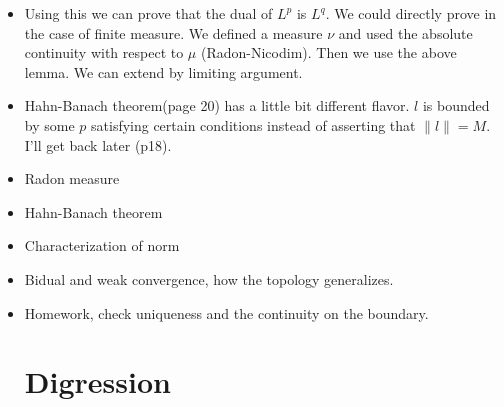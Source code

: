 \documentclass{article}
\newtheorem{lemma}[theorem]{Lemma}
\theoremstyle{remark}
\begin{document}
\begin{itemize}
\begin{lemma}
(ii) If $g$ is integrable on all sets of finite measure and $\sup_{\lVert f\rVert_{L^p}\leq 1 \text{, f is simple}}=\mid\int fg\mid=M<\infty$ then $\lVert g\rVert_{L^q}=M.$
\end{lemma}
\begin{proof}
The first conditions simply say about the existence a priori. Note that $g$ integrable on all sets of finite measure does not necessarily imply $g\in L^q$. 
    part (i): left direction is by Holder. Right direction is proven by considering specific functions, keeping in mind that the sign times the function is its absolute value (note about sigma finite: a space can be partitioned by finite sets: \url{https://math.stackexchange.com/questions/98965/significance-of-sigma-finite-measures}). Same spirit for part (ii).
\end{proof}
\item Using this we can prove that the dual of $L^p$ is $L^q$. We could directly prove in the case of finite measure. We defined a measure $\nu$ and used the absolute continuity with respect to $\mu$ (Radon-Nicodim). Then we use the above lemma. We can extend by limiting argument.
\item Hahn-Banach theorem(page 20) has a little bit different flavor. $l$ is bounded by some $p$ satisfying certain conditions instead of asserting that $\lVert l\rVert=M$. I'll get back later (p18).
\item Radon measure
\item Hahn-Banach theorem
\item Characterization of norm
\item Bidual and weak convergence, how the topology generalizes.
\item Homework, check uniqueness and the continuity on the boundary.


\newpage
\section*{Digression}

\end{itemize}
\end{document}
